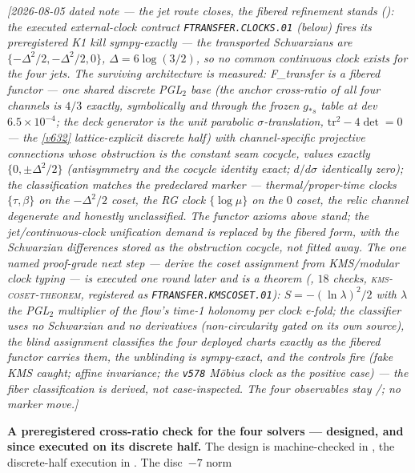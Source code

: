 \documentclass[11pt,a4paper]{article}
\begin{document}
\emph{[2026-08-05 dated note --- the jet route closes, the fibered refinement stands
(): the executed external-clock contract
\texttt{FTRANSFER.CLOCKS.01} (below) fires its preregistered K1 kill sympy-exactly --- the transported
Schwarzians are $\{-\Delta^2/2,-\Delta^2/2,0\}$, $\Delta=6\log(3/2)$, so \emph{no} common continuous
clock exists for the four jets.  The surviving architecture is measured: F\_transfer is a
\emph{fibered} functor --- one shared \emph{discrete} PGL$_2$ base (the anchor cross-ratio of all four
channels is $4/3$ exactly, symbolically \emph{and} through the frozen $g_{*s}$ table at dev
$6.5\times10^{-4}$; the deck generator is the unit parabolic $\sigma$-translation,
$\mathrm{tr}^2-4\det=0$ --- the \vref{v632} lattice-explicit discrete half) with channel-specific
projective connections whose obstruction is the \emph{constant} seam cocycle, values exactly
$\{0,\pm\Delta^2/2\}$ (antisymmetry and the cocycle identity exact; $d/d\sigma$ identically zero);
the classification matches the predeclared marker --- thermal/proper-time clocks $\{\tau,\beta\}$ on
the $-\Delta^2/2$ coset, the RG clock $\{\log\mu\}$ on the $0$ coset, the relic channel degenerate and
honestly unclassified.  The functor axioms above stand; the jet/continuous-clock unification demand is
\emph{replaced} by the fibered form, with the Schwarzian differences stored as the obstruction cocycle,
not fitted away.  The one named proof-grade next step --- derive the coset assignment from KMS/modular
clock typing --- is executed one round later and is a \emph{theorem}
(, $18$ checks, \textsc{kms-coset-theorem}, registered as
\texttt{FTRANSFER.KMSCOSET.01}): $S=-(\ln\lambda)^2/2$ with $\lambda$ the PGL$_2$ multiplier of the
flow's time-1 holonomy per clock e-fold; the classifier uses no Schwarzian and no derivatives
(non-circularity gated on its own source), the blind assignment classifies the four deployed charts
exactly as the fibered functor carries them, the unblinding is sympy-exact, and the controls fire
(fake KMS caught; affine invariance; the \texttt{v578} M\"obius clock as the positive case) --- the
fiber classification is derived, not case-inspected.  The four observables stay \mC/\mO; no marker
move.]}
\par\smallskip\noindent\textbf{A preregistered cross-ratio check for the four solvers ---
designed, and since executed on its discrete half.}
The design is machine-checked in , the discrete-half
execution in .  The disc~$-7$ norm
\end{document}
